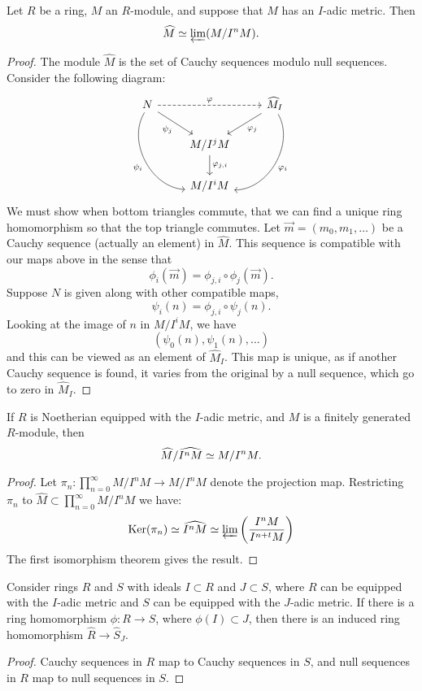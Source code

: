 \documentclass{ximera}
\begin{document}
\begin{theorem}
  Let $R$ be a ring, $M$ an $R$-module, and suppose that $M$ has an
  $I$-adic metric. Then
  \[
  \widehat{M} \simeq \varprojlim(M/I^n M).
  \]
  \begin{proof}
    The module $\hat{M}$ is the set of Cauchy sequences modulo null
    sequences.  Consider the following diagram:
    \[
    \begin{tikzcd}
      N\ar[ddr,bend right=60,swap,"\psi_i"] \ar[dr,swap,"\psi_j"]  \ar[dashed,rr,"\ph"] &   &  \hat{M}_{I} \ar[ddl,bend left=60,"\ph_i"] \ar[dl,"\ph_j"]\\
      & M/I^jM \ar[d,"\ph_{j,i}"] &\\
      & M/I^iM &
    \end{tikzcd}
    \]
    We must show when bottom triangles commute, that we can find a
    unique ring homomorphism so that the top triangle commutes. Let
    $\vec{m}=(m_0,m_1,\dots)$ be a Cauchy sequence (actually an element) in
    $\hat{M}$. This sequence is compatible with our maps above in
    the sense that
    \[
    \phi_i(\vec{m}) = \phi_{j,i} \circ \phi_j(\vec{m}).
    \]
    Suppose $N$ is given along with other compatible maps,
    \[
    \psi_i(n) = \phi_{j,i}\circ \psi_j(n).
    \]
    Looking at the image of $n$ in $M/I^iM$, we have
    \[
    (\psi_0(n), \psi_1(n),\dots)
    \]
    and this can be viewed as an element of $\hat{M}_{I}$. This map is
    unique, as if another Cauchy sequence is found, it varies from the
    original by a null sequence, which go to zero in $\hat{M}_{I}$.
  \end{proof}
\end{theorem}


\begin{corollary}\label{C:quotcomp}
  If $R$ is Noetherian equipped with the $I$-adic metric, and $M$ is a
  finitely generated $R$-module, then
  \[
  \widehat{M}/\widehat{I^n M} \simeq M/I^n M.
  \]
  \begin{proof}
    Let $\pi_n:\prod_{n=0}^\infty M/I^nM \to M/I^nM$ denote the
    projection map.  Restricting $\pi_n$ to $\hat{M} \subset
    \prod_{n=0}^\infty M/I^nM$ we have:
    \[
    \mathop{\mathrm{Ker}}\nolimits(\pi_n) \simeq \widehat{I^n M} \simeq \varprojlim \left(\frac{I^n M}{I^{n+t}M}\right)
    \]
    The first isomorphism theorem gives the result.
  \end{proof}
\end{corollary}





\begin{proposition}
  Consider rings $R$ and $S$ with ideals $I\subset R$ and $J\subset
  S$, where $R$ can be equipped with the $I$-adic metric and $S$ can
  be equipped with the $J$-adic metric. If there is a ring
  homomorphism $\phi:R \to S$, where $\phi(I) \subset J$, then there
  is an induced ring homomorphism $\hat{R}\to \hat{S}_J$.
  \begin{proof}
    Cauchy sequences in $R$ map to Cauchy sequences in $S$, and null
    sequences in $R$ map to null sequences in $S$.
  \end{proof}
\end{proposition}
\end{document}
